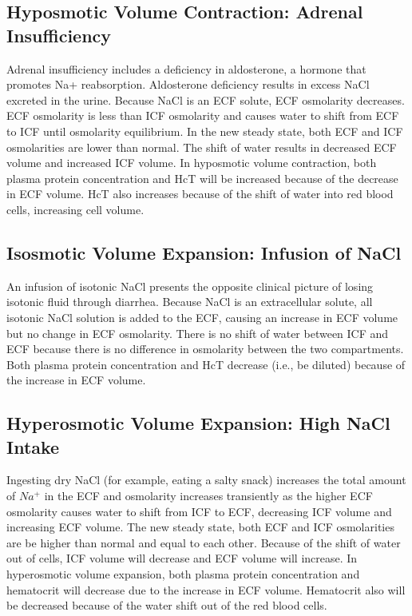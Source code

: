 \subsection{Hyposmotic Volume Contraction: Adrenal Insufficiency}

Adrenal insufficiency includes a deficiency in aldosterone, a hormone that promotes Na+ reabsorption. Aldosterone deficiency results in excess NaCl excreted in the urine. Because NaCl is an ECF solute, ECF osmolarity decreases. ECF osmolarity is less than ICF osmolarity and causes water to shift from ECF to ICF until osmolarity equilibrium. In the new steady state, both ECF and ICF osmolarities are lower than normal. The shift of water results in decreased ECF volume and increased ICF volume. In hyposmotic volume contraction, both plasma protein concentration and HcT will be increased because of the decrease in ECF volume. HcT also increases because of the shift of water into red blood cells, increasing cell volume. 

\subsection{Isosmotic Volume Expansion: Infusion of NaCl} 

An infusion of isotonic NaCl presents the opposite clinical picture of losing isotonic fluid through diarrhea. Because NaCl is an extracellular solute, all isotonic NaCl solution is added to the ECF, causing an increase in ECF volume but no change in ECF osmolarity. There is no shift of water between ICF and ECF because there is no difference in osmolarity between the two compartments. Both plasma protein concentration and HcT decrease (i.e., be diluted) because of the increase in ECF volume. 

\subsection{Hyperosmotic Volume Expansion: High NaCl Intake} 

Ingesting dry NaCl (for example, eating a salty snack) increases the total amount of $Na^+$ in the ECF and osmolarity increases transiently as the higher ECF osmolarity causes water to shift from ICF to ECF, decreasing ICF volume and increasing ECF volume. The new steady state, both ECF and ICF osmolarities are be higher than normal and equal to each other. Because of the shift of water out of cells, ICF volume will decrease and ECF volume will increase. In hyperosmotic volume expansion, both plasma protein concentration and hematocrit will decrease due to the increase in ECF volume. Hematocrit also will be decreased because of the water shift out of the red blood cells. 

